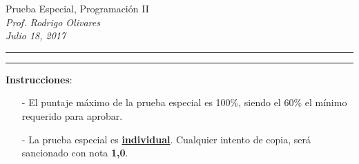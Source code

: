 \documentclass[10pt]{article}
\begin{document}
\begin{center}
    {\Large Prueba Especial, Programaci\'on II} \\
    \emph{\small Prof. Rodrigo Olivares} \\
    \emph{\scriptsize Julio 18, 2017}
\end{center}
\vspace*{-35pt}
\begin{center}
    \rule{1\textwidth}{.3pt}
\end{center}
\vspace*{-42pt}
\begin{center}
    \rule{1\textwidth}{2pt}
\end{center}

\vspace*{-15pt}
\textbf{Instrucciones}:
\vspace*{-15pt}

\begin{itemize}
    \item[-] El puntaje m\'aximo de la prueba especial es 100\%, siendo el 60\% el m\'inimo requerido para aprobar.
    \item[-] La prueba especial es \underline{\textbf{individual}}. Cualquier intento de copia, ser\'a sancionado con nota \textbf{1,0}.
\end{itemize}
\vspace*{-20pt}
\end{document}
